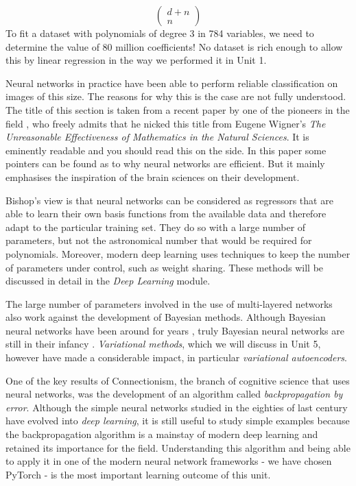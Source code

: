 $$
\left(  \begin{array}{c} d+n \\ n \end{array} \right)
$$
To fit a dataset with polynomials of degree 3 in 784 variables, we need to determine the value of 80 million
coefficients! No dataset is rich enough to allow this by linear regression in the way we performed it in Unit 1.

Neural networks in practice have been able to perform reliable classification on images of this size. The reasons
for why this is the case are not fully understood.
The title of this section is taken from a recent paper by one of the pioneers in the field \cite{sejnowski2020}, who
freely admits that he nicked this title from Eugene Wigner's \emph{The Unreasonable Effectiveness of Mathematics in the Natural Sciences}.
It is eminently readable and you should read this on the side.
In this paper some pointers can be found as to why neural networks are efficient. But it mainly emphasises the
inspiration of the brain sciences on their development.

Bishop's view \cite{bishop2006} is that neural networks can be considered as regressors that are able to learn
their own basis functions from the available data and therefore adapt to the particular training set. They do so
with a large number of parameters, but not the astronomical number that would be required for polynomials. Moreover,
modern deep learning uses techniques to keep the number of parameters under control, such as weight sharing. These
methods will be discussed in detail in the \emph{Deep Learning} module.

The large number of parameters involved in the use of multi-layered networks also work against the development
of Bayesian methods. Although Bayesian neural networks have been around for years \cite{bishop1995}, truly Bayesian
neural networks are still in their infancy \cite{jospin2020}. \emph{Variational methods}, which we will discuss
in Unit 5, however have made a considerable impact, in particular \emph{variational autoencoders}.



One of the key results of Connectionism, the branch of cognitive science that uses neural networks,
was the development of an algorithm called \emph{backpropagation by error}.
Although the simple neural networks studied in the eighties of last century have evolved into \emph{deep learning},
it is still useful to study simple examples because the backpropagation algorithm is a mainstay of modern deep
learning and retained its importance for the field. Understanding this algorithm and being able to apply
it in one of the modern neural network frameworks - we have chosen PyTorch - is the most important
learning outcome of this unit.

